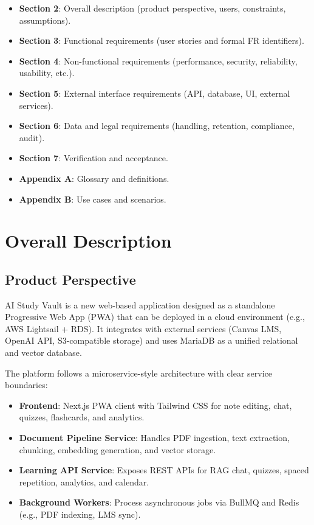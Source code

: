 \documentclass[12pt,a4paper]{article}
\begin{document}
\begin{itemize}
    \item \textbf{Section 2}: Overall description (product perspective, users, constraints, assumptions).
    \item \textbf{Section 3}: Functional requirements (user stories and formal FR identifiers).
    \item \textbf{Section 4}: Non-functional requirements (performance, security, reliability, usability, etc.).
    \item \textbf{Section 5}: External interface requirements (API, database, UI, external services).
    \item \textbf{Section 6}: Data and legal requirements (handling, retention, compliance, audit).
    \item \textbf{Section 7}: Verification and acceptance.
    \item \textbf{Appendix A}: Glossary and definitions.
    \item \textbf{Appendix B}: Use cases and scenarios.
\end{itemize}

\section{Overall Description}

\subsection{Product Perspective}

AI Study Vault is a new web-based application designed as a standalone Progressive Web App (PWA) that can be deployed in a cloud environment (e.g., AWS Lightsail + RDS). It integrates with external services (Canvas LMS, OpenAI API, S3-compatible storage) and uses MariaDB as a unified relational and vector database.

The platform follows a microservice-style architecture with clear service boundaries:

\begin{itemize}
    \item \textbf{Frontend}: Next.js PWA client with Tailwind CSS for note editing, chat, quizzes, flashcards, and analytics.
    \item \textbf{Document Pipeline Service}: Handles PDF ingestion, text extraction, chunking, embedding generation, and vector storage.
    \item \textbf{Learning API Service}: Exposes REST APIs for RAG chat, quizzes, spaced repetition, analytics, and calendar.
    \item \textbf{Background Workers}: Process asynchronous jobs via BullMQ and Redis (e.g., PDF indexing, LMS sync).
\end{itemize}
\end{document}
